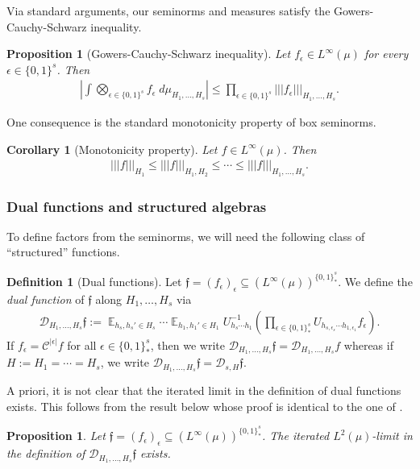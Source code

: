 \documentclass[11pt]{amsart}
\newtheorem{corollary}[lemma]{Corollary}
\newtheorem{proposition}[lemma]{Proposition}
\theoremstyle{definition}
\newtheorem{definition}[lemma]{Definition}
\DeclareMathOperator*{\E}{\mathbb{E}}
\newcommand{\CC}{{\mathcal C}}
\newcommand{\CD}{{\mathcal D}}
\newcommand{\eps}{\epsilon}
\newcommand{\nnorm}[1]{\lvert\!|\!| #1|\!|\!\rvert}
\newcommand{\inv}{^{-1}}
\newcommand{\1}{{\mathbf{1}}}
\newcommand{\abs}[1]{\mathopen{}\left| #1\mathclose{}\right|}
\newcommand{\brac}[1]{\mathopen{}\left( #1 \mathclose{}\right)}
\begin{document}
Via standard arguments, our seminorms and measures satisfy the Gowers-Cauchy-Schwarz inequality.
\begin{proposition}[Gowers-Cauchy-Schwarz inequality]
    Let $f_\eps\in L^\infty(\mu)$ for every $\eps\in\{0,1\}^s$. Then
    \begin{align*}
        \abs{\int \bigotimes_{\eps\in\{0,1\}^s}f_\eps\; d\mu_{H_1, \ldots, H_s}}\leq \prod_{\eps\in\{0,1\}^s}\nnorm{f_\eps}_{H_1, \ldots, H_s}.
    \end{align*}
\end{proposition}

One consequence is the standard monotonicity property of box seminorms.
\begin{corollary}[Monotonicity property]
    Let $f\in L^\infty(\mu)$. Then
    \begin{align*}
        \nnorm{f}_{H_1}\leq \nnorm{f}_{H_1, H_2}\leq \cdots \leq \nnorm{f}_{H_1, \ldots, H_s}.
    \end{align*}
\end{corollary}

\subsubsection{Dual functions and structured algebras}
To define factors from the seminorms, we will need the following class of ``structured'' functions.
\begin{definition}[Dual functions]
    Let $\mathfrak{f} = (f_\eps)_\eps\subseteq (L^\infty(\mu))^{\{0,1\}^s_*}$. We define the \textit{dual function} of $\mathfrak{f}$ along $H_1, \ldots, H_s$ via
    \begin{align*}
        \CD_{H_1, \ldots, H_s}\mathfrak{f}:= \E_{h_s,h_s'\in H_s}\cdots \E_{h_1,h_1'\in H_1}U_{h_s\cdots h_1}\inv\brac{\prod_{\eps\in\{0,1\}^s_*}U_{h_{s,\eps_s}\cdots h_{1,\eps_1}}f_\eps}.
    \end{align*}
    If $f_\eps = \CC^{|\eps|}f$ for all $\eps\in \{0,1\}^s_*$, 
    then we write $\CD_{H_1, \ldots, H_s}\mathfrak{f} = \CD_{H_1, \ldots, H_s}f$ whereas if $H:=H_1 = \cdots = H_s$, we write $\CD_{H_1, \ldots, H_s}\mathfrak{f} = \CD_{s, H}\mathfrak f$.
\end{definition}
A priori, it is not clear that the iterated limit in the definition of dual functions exists. This follows from the result below whose proof is identical to the one of \cite[Chapter 8, Proposition~25]{HK18}.
\begin{proposition}
    Let $\mathfrak{f} = (f_\eps)_\eps\subseteq (L^\infty(\mu))^{\{0,1\}^s_*}$. The iterated $L^2(\mu)$-limit in the definition of $\CD_{H_1, \ldots, H_s}\mathfrak{f}$ exists.
\end{proposition}
\end{document}
